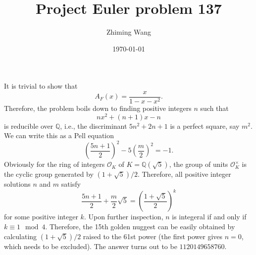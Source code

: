 \documentclass{amsart}
\title{Project Euler problem 137}
\author{Zhiming Wang}
\date{\today}
\begin{document}
\maketitle

It is trivial to show that
\[
A_F(x) = \frac{x}{1 - x - x^2}.
\]
Therefore, the problem boils down to finding positive integers $n$ such
that
\[
n x^2 + (n+1) x - n
\]
is reducible over $\mathbb{Q}$, i.e., the discriminant $5n^2 + 2n + 1$
is a perfect square, say $m^2$. We can write this as a Pell equation
\[
\left(\frac{5n+1}{2}\right)^2 - 5\left(\frac{m}{2}\right)^2 = -1.
\]
Obviously for the ring of integers $\mathscr{O}_K$ of $K =
\mathbb{Q}(\sqrt{5})$, the group of units $\mathscr{O}_K^\times$ is
the cyclic group generated by $(1 + \sqrt{5}) / 2$. Therefore, all
positive integer solutions $n$ and $m$ satisfy
\[
\frac{5n + 1}{2} + \frac{m}{2} \sqrt{5} =
\left(\frac{1 + \sqrt{5}}{2}\right)^k
\]
for some positive integer $k$. Upon further inspection, $n$ is
integeral if and only if $k \equiv 1 \mod 4$. Therefore, the 15th
golden nuggest can be easily obtained by calculating $(1 + \sqrt{5}) /
2$ raised to the 61st power (the first power gives $n = 0$, which
needs to be excluded). The answer turns out to be $1120149658760$.
\end{document}
